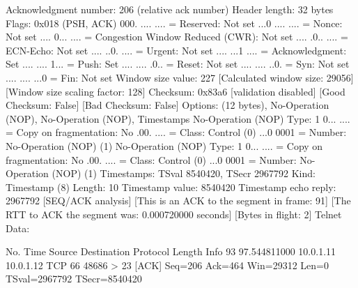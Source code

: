     Acknowledgment number: 206    (relative ack number)
    Header length: 32 bytes
    Flags: 0x018 (PSH, ACK)
        000. .... .... = Reserved: Not set
        ...0 .... .... = Nonce: Not set
        .... 0... .... = Congestion Window Reduced (CWR): Not set
        .... .0.. .... = ECN-Echo: Not set
        .... ..0. .... = Urgent: Not set
        .... ...1 .... = Acknowledgment: Set
        .... .... 1... = Push: Set
        .... .... .0.. = Reset: Not set
        .... .... ..0. = Syn: Not set
        .... .... ...0 = Fin: Not set
    Window size value: 227
    [Calculated window size: 29056]
    [Window size scaling factor: 128]
    Checksum: 0x83a6 [validation disabled]
        [Good Checksum: False]
        [Bad Checksum: False]
    Options: (12 bytes), No-Operation (NOP), No-Operation (NOP), Timestamps
        No-Operation (NOP)
            Type: 1
                0... .... = Copy on fragmentation: No
                .00. .... = Class: Control (0)
                ...0 0001 = Number: No-Operation (NOP) (1)
        No-Operation (NOP)
            Type: 1
                0... .... = Copy on fragmentation: No
                .00. .... = Class: Control (0)
                ...0 0001 = Number: No-Operation (NOP) (1)
        Timestamps: TSval 8540420, TSecr 2967792
            Kind: Timestamp (8)
            Length: 10
            Timestamp value: 8540420
            Timestamp echo reply: 2967792
    [SEQ/ACK analysis]
        [This is an ACK to the segment in frame: 91]
        [The RTT to ACK the segment was: 0.000720000 seconds]
        [Bytes in flight: 2]
Telnet
    Data: 

No.     Time           Source                Destination           Protocol Length Info
     93 97.544811000   10.0.1.11             10.0.1.12             TCP      66     48686 > 23 [ACK] Seq=206 Ack=464 Win=29312 Len=0 TSval=2967792 TSecr=8540420

